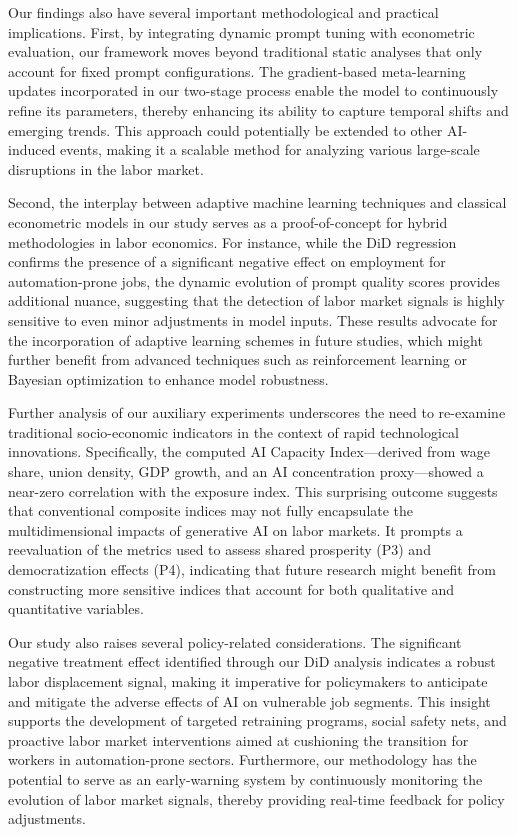 \documentclass{article}
\begin{document}
Our findings also have several important methodological and practical implications. First, by integrating dynamic prompt tuning with econometric evaluation, our framework moves beyond traditional static analyses that only account for fixed prompt configurations. The gradient-based meta-learning updates incorporated in our two-stage process enable the model to continuously refine its parameters, thereby enhancing its ability to capture temporal shifts and emerging trends. This approach could potentially be extended to other AI-induced events, making it a scalable method for analyzing various large-scale disruptions in the labor market.

Second, the interplay between adaptive machine learning techniques and classical econometric models in our study serves as a proof-of-concept for hybrid methodologies in labor economics. For instance, while the DiD regression confirms the presence of a significant negative effect on employment for automation-prone jobs, the dynamic evolution of prompt quality scores provides additional nuance, suggesting that the detection of labor market signals is highly sensitive to even minor adjustments in model inputs. These results advocate for the incorporation of adaptive learning schemes in future studies, which might further benefit from advanced techniques such as reinforcement learning or Bayesian optimization to enhance model robustness.

Further analysis of our auxiliary experiments underscores the need to re-examine traditional socio-economic indicators in the context of rapid technological innovations. Specifically, the computed AI Capacity Index—derived from wage share, union density, GDP growth, and an AI concentration proxy—showed a near-zero correlation with the exposure index. This surprising outcome suggests that conventional composite indices may not fully encapsulate the multidimensional impacts of generative AI on labor markets. It prompts a reevaluation of the metrics used to assess shared prosperity (P3) and democratization effects (P4), indicating that future research might benefit from constructing more sensitive indices that account for both qualitative and quantitative variables.

Our study also raises several policy-related considerations. The significant negative treatment effect identified through our DiD analysis indicates a robust labor displacement signal, making it imperative for policymakers to anticipate and mitigate the adverse effects of AI on vulnerable job segments. This insight supports the development of targeted retraining programs, social safety nets, and proactive labor market interventions aimed at cushioning the transition for workers in automation-prone sectors. Furthermore, our methodology has the potential to serve as an early-warning system by continuously monitoring the evolution of labor market signals, thereby providing real-time feedback for policy adjustments.
\end{document}
